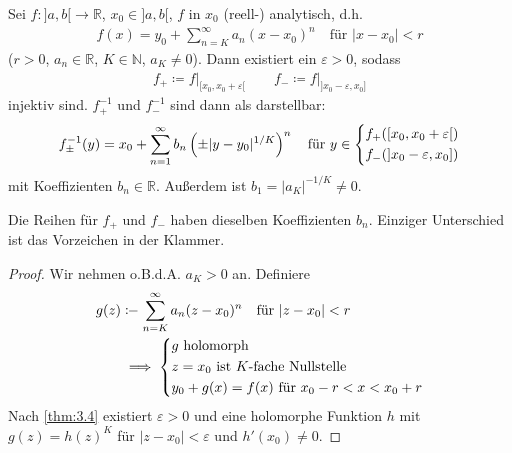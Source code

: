 \begin{theorem}[Satz]
  Sei $f : ]a,b[ \to \mathbb{R}$, $x_0 \in ]a,b[$, $f$ in $x_0$ (reell-) analytisch, d.h.
  \begin{align*}
    f(x) = y_0 + \sum\limits_{n=K}^{\infty} a_n (x-x_0)^n \quad \text{für } |x-x_0| < r
  \end{align*}
  ($r>0$, $a_n \in \mathbb{R}$, $K \in \mathbb{N}$, $a_K \neq 0$). Dann existiert ein $\varepsilon > 0$, sodass
  \begin{align*}
    f_{+} \coloneq f \Big|_{[x_0,x_0+\varepsilon[} \qquad f_{-} \coloneq f \Big|_{]x_0-\varepsilon,x_0]}
  \end{align*}
  injektiv sind. 
  $f_{+}^{-1}$ und $f_{-}^{-1}$ sind dann als  darstellbar:
  \begin{align*}
    f_{\pm}^{-1}(y) = x_0 + \sum\limits_{n=1}^{\infty} b_n \left( \pm |y-y_0|^{1/K} \right)^n
    \quad \text{für } y \in 
    \begin{dcases}
      f_{+}([x_0,x_0+\varepsilon[) \\
      f_{-}(]x_0-\varepsilon,x_0])
    \end{dcases}
  \end{align*}
  mit Koeffizienten $b_n \in \mathbb{R}$.
  Außerdem ist $b_1 = |a_K|^{-1/K} \neq 0$.

  Die Reihen für $f_{+}$ und $f_{-}$ haben dieselben Koeffizienten $b_n$. Einziger Unterschied ist das Vorzeichen in der Klammer.
  
  \begin{proof} %
    Wir nehmen o.B.d.A. $a_K > 0$ an. Definiere
    \begin{align*}
      g(z) &\coloneq \sum\limits_{n=K}^{\infty} a_n (z-x_0)^n \quad \text{für } |z-x_0| < r \\
      &\implies
      \begin{dcases}
        g \text{ holomorph} \\
        z = x_0 \text{ ist $K$-fache Nullstelle} \\
        y_0 + g(x) = f(x) \text{ für } x_0 - r < x < x_0 + r
      \end{dcases}
    \end{align*}
    Nach \ref{thm:3.4} existiert $\varepsilon > 0$ und eine holomorphe Funktion $h$ mit $g(z) = h(z)^K$ für $|z-x_0| < \varepsilon$ und $h'(x_0) \neq 0$.
    

\end{proof}
\end{theorem}

